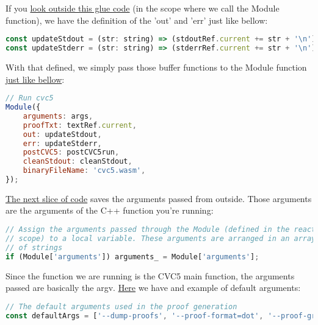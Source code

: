 \documentclass[12pt, a4paper]{article}
\begin{document}
If you \href{https://github.com/ufmg-smite/proof-visualizer/blob/main/frontend/src/components/VisualizerSmtDrawer/VisualizerSmtDrawer.tsx#L135-L136}{look outside this glue code} (in the scope where we call the Module function), we have the definition of the 'out' and 'err' just like bellow:

\begin{lstlisting}[language=JavaScript]
const updateStdout = (str: string) => (stdoutRef.current += str + '\n');
const updateStderr = (str: string) => (stderrRef.current += str + '\n');
\end{lstlisting}

With that defined, we simply pass those buffer functions to the Module function \href{https://github.com/ufmg-smite/proof-visualizer/blob/main/frontend/src/components/VisualizerSmtDrawer/VisualizerSmtDrawer.tsx#L357-L366}{just like bellow}:
\begin{lstlisting}[language=JavaScript]
// Run cvc5
Module({
    arguments: args,
    proofTxt: textRef.current,
    out: updateStdout,
    err: updateStderr,
    postCVC5: postCVC5run,
    cleanStdout: cleanStdout,
    binaryFileName: 'cvc5.wasm',
});
\end{lstlisting}

\href{https://github.com/ufmg-smite/proof-visualizer/blob/main/frontend/src/wasm/cvc5.js#L124-L127}{The next slice of code} saves the arguments passed from outside. Those arguments are the arguments of the C++ function you're running:

\begin{lstlisting}[language=JavaScript]
// Assign the arguments passed through the Module (defined in the react
// scope) to a local variable. These arguments are arranged in an array
// of strings
if (Module['arguments']) arguments_ = Module['arguments'];
\end{lstlisting}

Since the function we are running is the CVC5 main function, the arguments passed are basically the argv. \href{https://github.com/ufmg-smite/proof-visualizer/blob/main/frontend/src/components/VisualizerSmtDrawer/VisualizerSmtDrawer.tsx#L41-L42}{Here} we have and example of default arguments:

\begin{lstlisting}[language=JavaScript]
// The default arguments used in the proof generation
const defaultArgs = ['--dump-proofs', '--proof-format=dot', '--proof-granularity=theory-rewrite', '--dag-thresh=0'];
\end{lstlisting}
\end{document}
